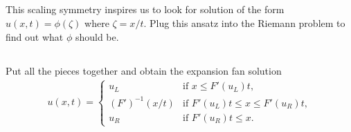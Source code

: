 \documentclass[11pt,letterpaper]{article}
\begin{document}
\subsection{}
This scaling symmetry inspires us to look for solution of the form $u(x,t) = \phi(\zeta)$ where $\zeta = x/t$. Plug this ansatz into the Riemann problem to find out what $\phi$ should be.

\subsection{}
Put all the pieces together and obtain the expansion fan solution
\begin{align}
    u(x,t) = \begin{cases}
        u_L &\text{if } x \leq F'(u_L) t, \\
        (F')^{-1}(x/t) &\text{if } F'(u_L) t \leq x \leq F'(u_R) t, \\
        u_R &\text{if } F'(u_R) t \leq x.
    \end{cases}
\end{align}

\vfill
\printbibliography
\end{document}
